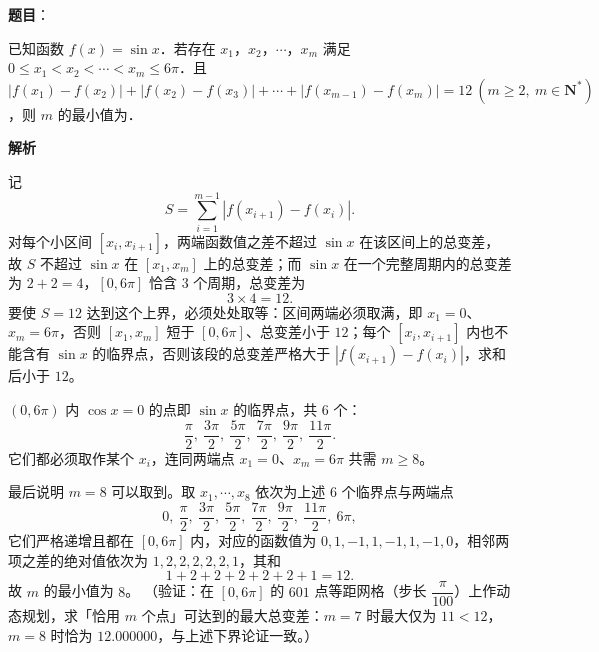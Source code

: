 \begin{answer}

\textbf{题目}：

已知函数 \(f(x)=\sin x\)．若存在 \(x_{1}\)，\(x_{2}\)，\(\cdots\)，\(x_{m}\) 满足 \(0\leqslant x_{1}<x_{2}<\cdots<x_{m}\leqslant 6\pi\)．且 \(|f(x_{1})-f(x_{2})|+|f(x_{2})-f(x_{3})|+\cdots+|f(x_{m-1})-f(x_{m})|=12\ (m\geqslant 2,\ m\in\mathbf{N}^{*})\)，则 \(m\) 的最小值为\gkblank{}．

\textbf{解析}

记
\nopagebreak[4]
\[
S=\sum_{i=1}^{m-1}\left|f(x_{i+1})-f(x_{i})\right|.
\]
对每个小区间 \([x_{i},x_{i+1}]\)，两端函数值之差不超过 \(\sin x\) 在该区间上的总变差，故 \(S\) 不超过 \(\sin x\) 在 \([x_{1},x_{m}]\) 上的总变差；而 \(\sin x\) 在一个完整周期内的总变差为 \(2+2=4\)，\([0,6\pi]\) 恰含 \(3\) 个周期，总变差为
\nopagebreak[4]
\[
3\times4=12.
\]
要使 \(S=12\) 达到这个上界，必须处处取等：区间两端必须取满，即 \(x_{1}=0\)、\(x_{m}=6\pi\)，否则 \([x_{1},x_{m}]\) 短于 \([0,6\pi]\)、总变差小于 \(12\)；每个 \([x_{i},x_{i+1}]\) 内也不能含有 \(\sin x\) 的临界点，否则该段的总变差严格大于 \(\left|f(x_{i+1})-f(x_{i})\right|\)，求和后小于 \(12\)。

\((0,6\pi)\) 内 \(\cos x=0\) 的点即 \(\sin x\) 的临界点，共 \(6\) 个：
\nopagebreak[4]
\[
\frac{\pi}{2},\ \frac{3\pi}{2},\ \frac{5\pi}{2},\ \frac{7\pi}{2},\ \frac{9\pi}{2},\ \frac{11\pi}{2}.
\]
它们都必须取作某个 \(x_{i}\)，连同两端点 \(x_{1}=0\)、\(x_{m}=6\pi\) 共需 \(m\geqslant8\)。

最后说明 \(m=8\) 可以取到。取 \(x_{1},\cdots,x_{8}\) 依次为上述 \(6\) 个临界点与两端点
\nopagebreak[4]
\[
0,\ \frac{\pi}{2},\ \frac{3\pi}{2},\ \frac{5\pi}{2},\ \frac{7\pi}{2},\ \frac{9\pi}{2},\ \frac{11\pi}{2},\ 6\pi,
\]
它们严格递增且都在 \([0,6\pi]\) 内，对应的函数值为 \(0,1,-1,1,-1,1,-1,0\)，相邻两项之差的绝对值依次为 \(1,2,2,2,2,2,1\)，其和
\nopagebreak[4]
\[
1+2+2+2+2+2+1=12.
\]
故 \(m\) 的最小值为 \(8\)。
（验证：在 \([0,6\pi]\) 的 \(601\) 点等距网格（步长 \(\dfrac{\pi}{100}\)）上作动态规划，求「恰用 \(m\) 个点」可达到的最大总变差：\(m=7\) 时最大仅为 \(11<12\)，\(m=8\) 时恰为 \(12.000000\)，与上述下界论证一致。）


\end{answer}

